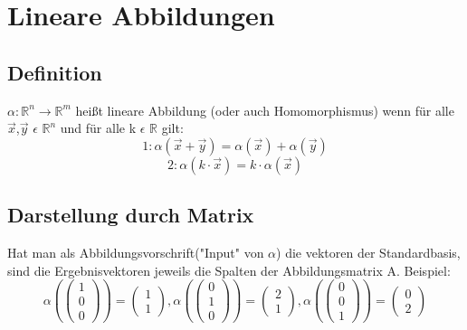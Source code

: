 \documentclass[a4paper,10pt]{scrartcl}
\begin{document}
    \section{Lineare Abbildungen}
        \subsection{Definition}
            $\alpha: \mathbb{R}^n \rightarrow \mathbb{R}^m$ heißt lineare Abbildung (oder auch Homomorphismus) wenn für alle \\$\vec{x}$,$\vec{y}$ $\epsilon$ $\mathbb{R}^n$ und
            für alle k $\epsilon$ $\mathbb{R}$ gilt:
            \[1: \alpha(\vec{x} + \vec{y}) = \alpha(\vec{x}) + \alpha(\vec{y})\]
            \[2: \alpha(k \cdot \vec{x}) = k \cdot \alpha(\vec{x})\]
        \subsection{Darstellung durch Matrix}
            Hat man als Abbildungsvorschrift("Input" von $\alpha$) die vektoren der Standardbasis, sind die Ergebnisvektoren jeweils die Spalten der Abbildungsmatrix A. Beispiel:
            \[
                \alpha(
                    \begin{pmatrix}
                        1 \\ 0 \\ 0
                    \end{pmatrix}
                ) = 
                \begin{pmatrix}
                    1 \\ 1
                \end{pmatrix},
                \alpha(
                    \begin{pmatrix}
                        0 \\ 1 \\ 0
                    \end{pmatrix}
                ) = 
                \begin{pmatrix}
                    2 \\ 1
                \end{pmatrix},
                \alpha(
                    \begin{pmatrix}
                        0 \\ 0 \\ 1
                    \end{pmatrix}
                ) = 
                \begin{pmatrix}
                    0 \\ 2
                \end{pmatrix}
            \]
\end{document}
